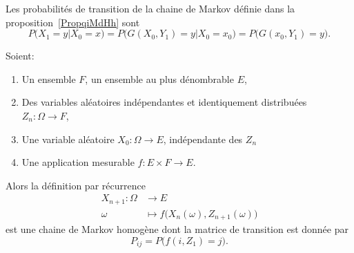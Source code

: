 Les probabilités de transition de la chaine de Markov définie dans la proposition~\ref{PropqiMdHh} sont
\begin{equation}
	P(X_1=y|X_0=x)=P\big( G(X_0,Y_1)=y|X_0=x_0 \big)=P\big( G(x_0,Y_1)=y \big).
\end{equation}

\begin{proposition}       \label{PROPooBYELooKLsthC}
	Soient:
	\begin{enumerate}
		\item
		      Un ensemble \( F\), un ensemble au plus dénombrable \( E\),
		\item
		      Des variables aléatoires indépendantes et identiquement distribuées \( Z_n\colon \Omega\to F\),
		\item
		      Une variable aléatoire \( X_0\colon \Omega\to E\), indépendante des \( Z_n\)
		\item
		      Une application mesurable \( f\colon E\times F \to E\).
	\end{enumerate}
	Alors la définition par récurrence
	\begin{equation}
		\begin{aligned}
			X_{n+1}\colon \Omega & \to E                                            \\
			\omega               & \mapsto f\big( X_n(\omega),Z_{n+1}(\omega) \big)
		\end{aligned}
	\end{equation}
	est une chaine de Markov homogène dont la matrice de transition est donnée par
	\begin{equation}
		P_{ij}=P\big( f(i,Z_1)=j \big).
	\end{equation}
\end{proposition}

